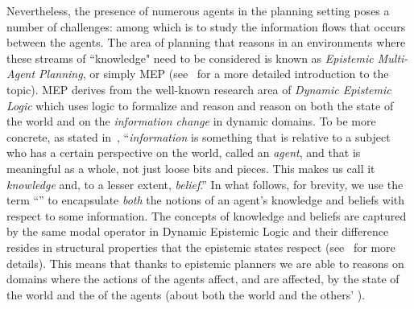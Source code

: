 Nevertheless, the presence of numerous agents in the planning setting poses a number of challenges: among which is to study the information flows that occurs between the agents. %
The area of planning that reasons in an environments where these streams of ``knowledge" need to be considered is known as \emph{Epistemic Multi-Agent Planning}, or simply MEP (see~\cite{fagin1994reasoning,bolander2017gentle} for a more detailed introduction to the topic).
MEP derives from the well-known research area of \emph{Dynamic Epistemic Logic} which uses logic to formalize and reason and reason on both the state of the world and on the \emph{information change} in dynamic domains. %
To be more concrete, as stated in~\cite{van2007dynamic}, ``\emph{information} is something that is relative to a subject who has a certain perspective on the world, called an \emph{agent}, and that is meaningful as a whole, not just loose bits and pieces. This makes us call it \emph{knowledge} and, to a lesser extent, \emph{belief}.'' %
In what follows, for brevity, we use the term ``\knobel'' to encapsulate \textit{both} the notions of an agent's knowledge and beliefs with respect to some information.
The concepts of knowledge and beliefs are captured by the same modal operator in Dynamic Epistemic Logic and their difference resides in structural properties that the epistemic states respect (see~\cite{fagin1994reasoning} for more details).
This means that thanks to epistemic planners we are able to reasons on domains where the actions of the agents affect, and are affected, by the state of the world and the \knobel of the agents (about both the world and the others' \knobel).

